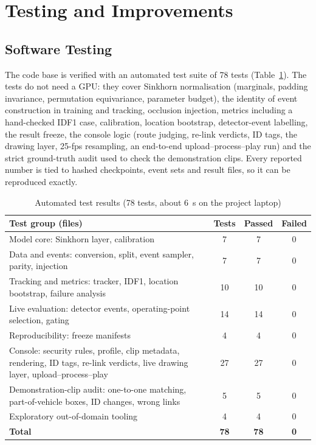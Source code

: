 \section{Testing and Improvements}
\label{sec:testing_improvements}

\subsection{Software Testing}
\label{sec:software_testing}

The code base is verified with an automated test suite of 78 tests (Table~\ref{tab:tests}). The tests do not need a GPU: they cover Sinkhorn normalisation (marginals, padding invariance, permutation equivariance, parameter budget), the identity of event construction in training and tracking, occlusion injection, metrics including a hand-checked IDF1 case, calibration, location bootstrap, detector-event labelling, the result freeze, the console logic (route judging, re-link verdicts, ID tags, the drawing layer, 25-fps resampling, an end-to-end upload--process--play run) and the strict ground-truth audit used to check the demonstration clips. Every reported number is tied to hashed checkpoints, event sets and result files, so it can be reproduced exactly.

\begin{table}[H]
    \centering
    \caption{Automated test results (78 tests, about $6$~s on the project laptop)}
    \label{tab:tests}
    \small
    \small
    \begin{tabularx}{\textwidth}{X c c c}
        \toprule
        \textbf{Test group (files)} & \textbf{Tests} & \textbf{Passed} & \textbf{Failed} \\
        \midrule
        Model core: Sinkhorn layer, calibration & 7 & 7 & 0 \\
        Data and events: conversion, split, event sampler, parity, injection & 7 & 7 & 0 \\
        Tracking and metrics: tracker, IDF1, location bootstrap, failure analysis & 10 & 10 & 0 \\
        Live evaluation: detector events, operating-point selection, gating & 14 & 14 & 0 \\
        Reproducibility: freeze manifests & 4 & 4 & 0 \\
        Console: security rules, profile, clip metadata, rendering, ID tags, re-link verdicts, live drawing layer, upload--process--play & 27 & 27 & 0 \\
        Demonstration-clip audit: one-to-one matching, part-of-vehicle boxes, ID changes, wrong links & 5 & 5 & 0 \\
        Exploratory out-of-domain tooling & 4 & 4 & 0 \\
        \midrule
        \textbf{Total} & \textbf{78} & \textbf{78} & \textbf{0} \\
        \bottomrule
    \end{tabularx}
\end{table}

